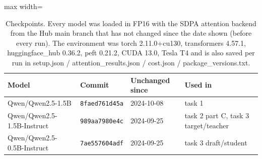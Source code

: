 \begin{table}[!htb]
\centering
\scriptsize
\setlength{\tabcolsep}{3.5pt}
\caption{Checkpoints. Every model was loaded in FP16 with the SDPA attention backend from the Hub main branch that has not changed since the date shown (before every run). The environment was torch 2.11.0+cu130, transformers 4.57.1, huggingface\_hub 0.36.2, peft 0.21.2, CUDA 13.0, Tesla T4 and is also saved per run in setup.json / attention\_results.json / cost.json / package\_versions.txt.}
\label{tab:revisions}
\begin{adjustbox}{max width=\linewidth}
\begin{tabular}{llll}
\toprule
Model & Commit & Unchanged since & Used in \\
\midrule
Qwen/Qwen2.5-1.5B & \texttt{8faed761d45a} & 2024-10-08 & task 1 \\
Qwen/Qwen2.5-1.5B-Instruct & \texttt{989aa7980e4c} & 2024-09-25 & task 2 part C, task 3 target/teacher \\
Qwen/Qwen2.5-0.5B-Instruct & \texttt{7ae557604adf} & 2024-09-25 & task 3 draft/student \\
\bottomrule
\end{tabular}
\end{adjustbox}
\end{table}

